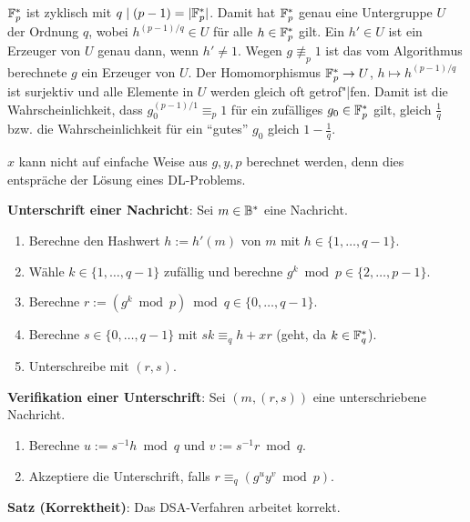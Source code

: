 \linie

$\mathbb{F}_p^\ast$ ist zyklisch mit $q \mid (p - 1) = |\mathbb{F}_p^\ast|$.
Damit hat $\mathbb{F}_p^\ast$ genau eine Untergruppe $U$ der Ordnung $q$,
wobei $h^{(p-1)/q} \in U$ für alle $h \in \mathbb{F}_p^\ast$ gilt.
Ein $h' \in U$ ist ein Erzeuger von $U$ genau dann, wenn $h' \not= 1$.
Wegen $g \not\equiv_p 1$ ist das vom Algorithmus berechnete $g$ ein Erzeuger von $U$.
Der Homomorphismus $\mathbb{F}_p^\ast \to U$, $h \mapsto h^{(p-1)/q}$ ist surjektiv und
alle Elemente in $U$ werden gleich oft getrof"|fen.
Damit ist die Wahrscheinlichkeit, dass $g_0^{(p-1)/1} \equiv_p 1$ für ein zufälliges
$g_0 \in \mathbb{F}_p^\ast$ gilt, gleich $\frac{1}{q}$ bzw.
die Wahrscheinlichkeit für ein "`gutes"' $g_0$ gleich $1 - \frac{1}{q}$.

$x$ kann nicht auf einfache Weise aus $g, y, p$ berechnet werden,
denn dies entspräche der Lösung eines DL-Problems.

\linie

\textbf{Unterschrift einer Nachricht}:
Sei $m \in \mathbb{B}^\ast$ eine Nachricht.
\begin{enumerate}
    \item
    Berechne den Hashwert $h := h'(m)$ von $m$ mit $h \in \{1, \dotsc, q - 1\}$.

    \item
    Wähle $k \in \{1, \dotsc, q - 1\}$ zufällig und berechne
    $g^k \bmod p \in \{2, \dotsc, p - 1\}$.

    \item
    Berechne $r := (g^k \bmod p) \bmod q \in \{0, \dotsc, q-1\}$.

    \item
    Berechne $s \in \{0, \dotsc, q-1\}$ mit $sk \equiv_q h + xr$
    (geht, da $k \in \mathbb{F}_q^\ast$).

    \item
    Unterschreibe mit $(r, s)$.
\end{enumerate}

\textbf{Verifikation einer Unterschrift}:
Sei $(m, (r, s))$ eine unterschriebene Nachricht.
\begin{enumerate}
    \item
    Berechne $u := s^{-1} h \bmod q$ und $v := s^{-1} r \bmod q$.

    \item
    Akzeptiere die Unterschrift, falls $r \equiv_q (g^u y^v \bmod p)$.
\end{enumerate}

\linie

\textbf{Satz (Korrektheit)}:
Das DSA-Verfahren arbeitet korrekt.

